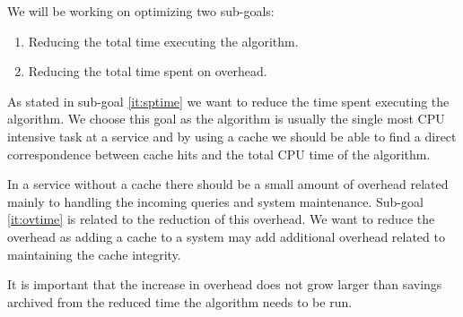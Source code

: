 We will be working on optimizing two sub-goals:
\begin{enumerate}
\item \label{it:sptime} Reducing the total time executing the \spath algorithm.
\item \label{it:ovtime} Reducing the total time spent on overhead.
\end{enumerate}


As stated in sub-goal \ref{it:sptime} we want to reduce the time spent executing the \spath algorithm. We choose this goal as the \spath algorithm is usually the single most CPU intensive task at a \spath service \cite{ref.} and by using a cache we should be able to find a direct correspondence between cache hits and the total CPU time of the \spath algorithm.

In a \spath service without a cache there should be a small amount of overhead related mainly to handling the incoming queries and system maintenance. Sub-goal \ref{it:ovtime} is related to the reduction of this overhead. We want to reduce the overhead as adding a cache to a \spath system may add additional overhead related to maintaining the cache integrity.

It is important that the increase in overhead does not grow larger than savings archived from the reduced time the \spath algorithm needs to be run.




